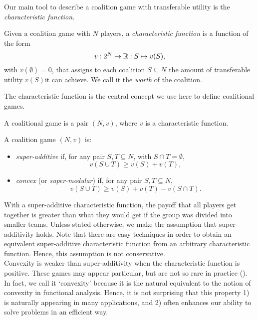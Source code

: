 Our main tool to describe a coalition game with transferable utility is the \emph{characteristic function.}
\begin{definition}
Given a coalition game with $N$ players, a \emph{characteristic function} is a function of the form
$$v : 2^N \rightarrow \mathbb{R}: S \mapsto v(S), $$
with $v(\emptyset) = 0$, that assigns to each coalition $S \subseteq N$ the amount of transferable utility $v(S)$it can achieve.  We call it the \emph{worth} of the coalition.
\end{definition}
The characteristic function is the central concept we use here to define coalitional games.
\begin{definition}
A coalitional game is a pair $(N,v)$, where $v$ is a characteristic function.
\end{definition}
\begin{definition}
A coalition game $(N,v)$ is:
\begin{itemize}
\item \emph{super-additive} if, for any pair $S,T \subseteq N$, with $S \cap T = \emptyset$,
$$v(S \cup T) \geq v(S) + v(T), $$
\item \emph{convex} (or \emph{super-modular}) if,  for any pair $S,T \subseteq N$,
$$v(S \cup T) \geq v(S) + v(T) - v(S \cap T). $$
\end{itemize}
\end{definition}
With a super-additive characteristic function, the payoff that all players get together is greater than what they would get if the group was divided into smaller teams. Unless stated otherwise, we make the assumption that super-additivity holds. Note that there are easy techniques in order to obtain an equivalent super-additive characteristic function from an arbitrary characteristic function.  Hence, this assumption is not conservative.\\
Convexity is weaker than super-additivity when the characteristic function is positive. These games may appear particular, but are not so rare in practice (\cite{ShLeMSAG}). In fact, we call it `convexity' because it is the natural equivalent to the notion of convexity in functional analysis.  Hence, it is not surprising that this property 1) is naturally appearing in many applications, and 2) often enhances our ability to solve problems in an efficient way.
